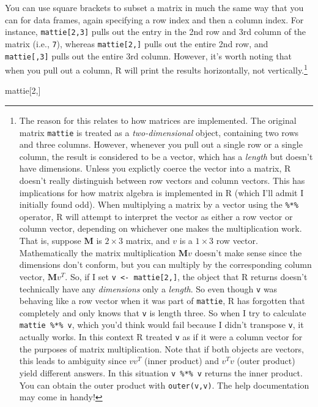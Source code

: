 \documentclass[]{book}
\newenvironment{Shaded}{\begin{snugshade}}{\end{snugshade}}
\newcommand{\DecValTok}[1]{\textcolor[rgb]{0.00,0.00,0.81}{#1}}
\newcommand{\NormalTok}[1]{#1}
\let\rmarkdownfootnote\footnote%
\def\footnote{\protect\rmarkdownfootnote}
\begin{document}
You can use square brackets to subset a matrix in much the same way that you can for data frames, again specifying a row index and then a column index. For instance, \texttt{mattie{[}2,3{]}} pulls out the entry in the 2nd row and 3rd column of the matrix (i.e., \texttt{7}), whereas \texttt{mattie{[}2,{]}} pulls out the entire 2nd row, and \texttt{mattie{[},3{]}} pulls out the entire 3rd column. However, it's worth noting that when you pull out a column, R will print the results horizontally, not vertically.\footnote{The reason for this relates to how matrices are implemented. The original matrix \texttt{mattie} is treated as a \emph{two-dimensional} object, containing two rows and three columns. However, whenever you pull out a single row or a single column, the result is considered to be a vector, which has a \emph{length} but doesn't have dimensions. Unless you explictly coerce the vector into a matrix, R doesn't really distinguish between row vectors and column vectors. This has implications for how matrix algebra is implemented in R (which I'll admit I initially found odd). When multiplying a matrix by a vector using the \texttt{\%*\%} operator, R will attempt to interpret the vector as either a row vector or column vector, depending on whichever one makes the multiplication work. That is, suppose \(\mathbf{M}\) is \(2\times 3\) matrix, and \(v\) is a \(1\times 3\) row vector. Mathematically the matrix multiplication \(\mathbf{M}v\) doesn't make sense since the dimensions don't conform, but you can multiply by the corresponding column vector, \(\mathbf{M}v^T\). So, if I set \texttt{v\ \textless{}-\ mattie{[}2,{]}}, the object that R returns doesn't technically have any \emph{dimensions} only a \emph{length}. So even though \texttt{v} was behaving like a row vector when it was part of \texttt{mattie}, R has forgotten that completely and only knows that \texttt{v} is length three. So when I try to calculate \texttt{mattie\ \%*\%\ v}, which you'd think would fail because I didn't transpose \texttt{v}, it actually works. In this context R treated \texttt{v} as if it were a column vector for the purposes of matrix multiplication. Note that if both objects are vectors, this leads to ambiguity since \(vv^T\) (inner product) and \(v^Tv\) (outer product) yield different answers. In this situation \texttt{v\ \%*\%\ v} returns the inner product. You can obtain the outer product with \texttt{outer(v,v)}. The help documentation may come in handy!}

\begin{Shaded}
\begin{Highlighting}[]
\NormalTok{mattie[}\DecValTok{2}\NormalTok{,]}
\end{Highlighting}
\end{Shaded}
\end{document}

